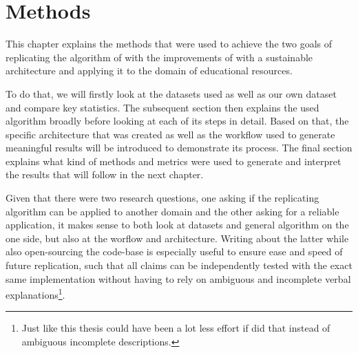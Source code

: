\chapter{Methods}


This chapter explains the methods that were used to achieve the two goals of replicating the algorithm of \textcite{Derrac2015} with the improvements of \cite{Ager2018,Alshaikh2020} with a sustainable architecture and applying it to the domain of educational resources.  

To do that, we will firstly look at the datasets \mainalgos used as well as our own dataset and compare key statistics. The subsequent section then explains the used algorithm broadly before looking at each of its steps in detail. Based on that, the specific architecture that was created as well as the workflow used to generate meaningful results will be introduced to demonstrate its process. The final section explains what kind of methods and metrics were used to generate and interpret the results that will follow in the next chapter.

Given that there were two research questions, one asking if the replicating algorithm can be applied to another domain and the other asking for a reliable application, it makes sense to both look at datasets and general algorithm on the one side, but also at the worflow and architecture. Writing about the latter while also open-sourcing the code-base is especially useful to ensure ease and speed of future replication, such that all claims can be independently tested with the exact same implementation without having to rely on ambiguous and incomplete verbal explanations\footnote{Just like this thesis could have been a lot less effort if \mainalgos did that instead of ambiguous incomplete descriptions. }. 




